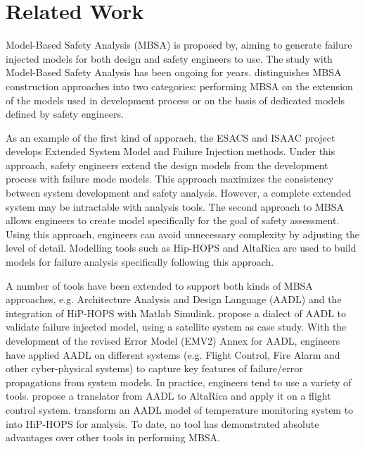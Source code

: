\section{Related Work}
Model-Based Safety Analysis (MBSA) is proposed by\cite{mbsa05}, aiming to generate failure injected models for both design and safety engineers to use. The study with Model-Based Safety Analysis has been ongoing for years. \cite{mbsa11} distinguishes MBSA construction approaches into two categories: performing MBSA on the extension of the models used in development process or on the basis of dedicated models defined by safety engineers.

As an example of the first kind of apporach, the ESACS and ISAAC project develops Extended System Model and Failure Injection methods\cite{erts06}\cite{esrel03}. Under this approach, safety engineers extend the design models from the development process with failure mode models. This approach maximizes the consistency between system development and safety analysis. However, a complete extended system may be intractable with analysis tools. The second approach to MBSA allows engineers to create model specifically for the goal of safety assessment. Using this approach, engineers can avoid unnecessary complexity by adjusting the level of detail. Modelling tools such as Hip-HOPS and AltaRica are used to build models for failure analysis specifically following this approach. 



A number of tools have been extended to support both kinds of MBSA approaches, e.g. Architecture Analysis and Design Language (AADL)\cite{cmu07}\cite{sae11} and the integration of HiP-HOPS with Matlab Simulink\cite{dsn01}. \cite{aadl13} propose a dialect of AADL to validate failure injected model, using a satellite system as case study. With the development of the revised Error Model (EMV2) Annex\cite{aadlemv2} for AADL, engineers have applied AADL on different systems (e.g. Flight Control\cite{field1}, Fire Alarm\cite{field2} and other cyber-physical systems\cite{field3}) to capture key features of failure/error propagations from system models. In practice, engineers tend to use a variety of tools. \cite{aadl_altarica} propose a translator from AADL to AltaRica and apply it on a flight control system.\cite{aadl_hiphop} transform an AADL model of temperature monitoring system to into HiP-HOPS for analysis. To date, no tool has demonstrated absolute advantages over other tools in performing MBSA.
